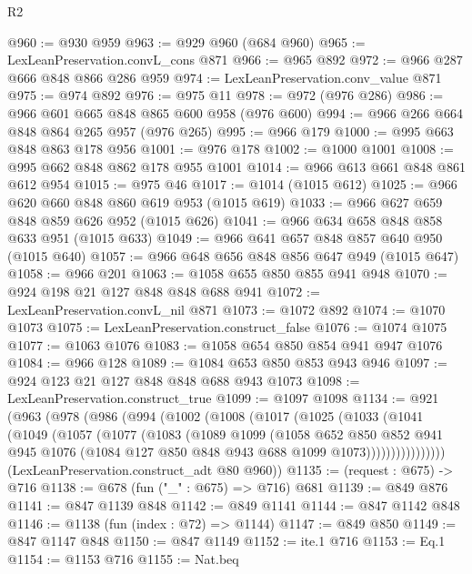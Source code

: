 \begin{lexlean}{R2}
\begin{coremodule}
@960 := @930 @959
@963 := @929 @960 (@684 @960)
@965 := LexLeanPreservation.convL_cons @871
@966 := @965 @892
@972 := @966 @287 @666 @848 @866 @286 @959
@974 := LexLeanPreservation.conv_value @871
@975 := @974 @892
@976 := @975 @11
@978 := @972 (@976 @286)
@986 := @966 @601 @665 @848 @865 @600 @958 (@976 @600)
@994 := @966 @266 @664 @848 @864 @265 @957 (@976 @265)
@995 := @966 @179
@1000 := @995 @663 @848 @863 @178 @956
@1001 := @976 @178
@1002 := @1000 @1001
@1008 := @995 @662 @848 @862 @178 @955 @1001
@1014 := @966 @613 @661 @848 @861 @612 @954
@1015 := @975 @46
@1017 := @1014 (@1015 @612)
@1025 := @966 @620 @660 @848 @860 @619 @953 (@1015 @619)
@1033 := @966 @627 @659 @848 @859 @626 @952 (@1015 @626)
@1041 := @966 @634 @658 @848 @858 @633 @951 (@1015 @633)
@1049 := @966 @641 @657 @848 @857 @640 @950 (@1015 @640)
@1057 := @966 @648 @656 @848 @856 @647 @949 (@1015 @647)
@1058 := @966 @201
@1063 := @1058 @655 @850 @855 @941 @948
@1070 := @924 @198 @21 @127 @848 @848 @688 @941
@1072 := LexLeanPreservation.convL_nil @871
@1073 := @1072 @892
@1074 := @1070 @1073
@1075 := LexLeanPreservation.construct_false
@1076 := @1074 @1075
@1077 := @1063 @1076
@1083 := @1058 @654 @850 @854 @941 @947 @1076
@1084 := @966 @128
@1089 := @1084 @653 @850 @853 @943 @946
@1097 := @924 @123 @21 @127 @848 @848 @688 @943 @1073
@1098 := LexLeanPreservation.construct_true
@1099 := @1097 @1098
@1134 := @921
    (@963
      (@978
        (@986
          (@994
            (@1002
              (@1008
                (@1017
                  (@1025
                    (@1033
                      (@1041
                        (@1049
                          (@1057
                            (@1077
                              (@1083
                                (@1089
                                  @1099
                                  (@1058
                                    @652
                                    @850
                                    @852
                                    @941
                                    @945
                                    @1076
                                    (@1084 @127 @850 @848 @943 @688 @1099 @1073))))))))))))))))
      (LexLeanPreservation.construct_adt @80 @960))
@1135 := (request : @675) -> @716
@1138 := @678 (fun ("_" : @675) => @716) @681
@1139 := @849 @876
@1141 := @847 @1139 @848
@1142 := @849 @1141
@1144 := @847 @1142 @848
@1146 := @1138 (fun (index : @72) => @1144)
@1147 := @849 @850
@1149 := @847 @1147 @848
@1150 := @847 @1149
@1152 := ite.{1} @716
@1153 := Eq.{1}
@1154 := @1153 @716
@1155 := Nat.beq

\end{coremodule}
\end{lexlean}
